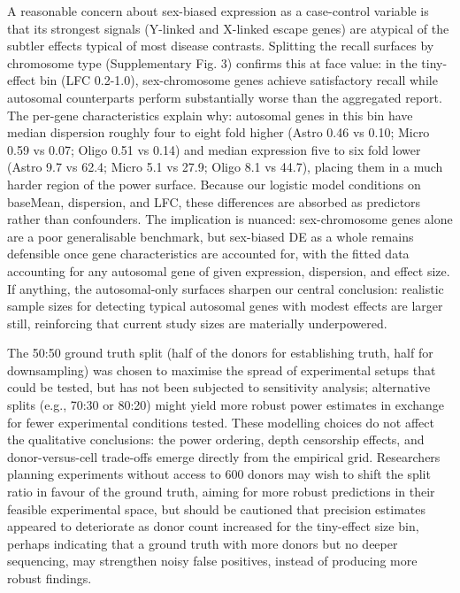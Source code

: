 \documentclass[
]{article}
\begin{document}
A reasonable concern about sex-biased expression as a case-control
variable is that its strongest signals (Y-linked and X-linked escape
genes) are atypical of the subtler effects typical of most disease
contrasts. Splitting the recall surfaces by chromosome type
(Supplementary Fig. 3) confirms this at face value: in the tiny-effect
bin (\textbar LFC\textbar{} 0.2-1.0), sex-chromosome genes achieve
satisfactory recall while autosomal counterparts perform substantially
worse than the aggregated report. The per-gene characteristics explain
why: autosomal genes in this bin have median dispersion roughly four to
eight fold higher (Astro 0.46 vs 0.10; Micro 0.59 vs 0.07; Oligo 0.51 vs
0.14) and median expression five to six fold lower (Astro 9.7 vs 62.4;
Micro 5.1 vs 27.9; Oligo 8.1 vs 44.7), placing them in a much harder
region of the power surface. Because our logistic model conditions on
baseMean, dispersion, and \textbar LFC\textbar, these differences are
absorbed as predictors rather than confounders. The implication is
nuanced: sex-chromosome genes alone are a poor generalisable benchmark,
but sex-biased DE as a whole remains defensible once gene
characteristics are accounted for, with the fitted data accounting for
any autosomal gene of given expression, dispersion, and effect size. If
anything, the autosomal-only surfaces sharpen our central conclusion:
realistic sample sizes for detecting typical autosomal genes with modest
effects are larger still, reinforcing that current study sizes are
materially underpowered.

The 50:50 ground truth split (half of the donors for establishing truth,
half for downsampling) was chosen to maximise the spread of experimental
setups that could be tested, but has not been subjected to sensitivity
analysis; alternative splits (e.g., 70:30 or 80:20) might yield more
robust power estimates in exchange for fewer experimental conditions
tested. These modelling choices do not affect the qualitative
conclusions: the power ordering, depth censorship effects, and
donor-versus-cell trade-offs emerge directly from the empirical grid.
Researchers planning experiments without access to 600 donors may wish
to shift the split ratio in favour of the ground truth, aiming for more
robust predictions in their feasible experimental space, but should be
cautioned that precision estimates appeared to deteriorate as donor
count increased for the tiny-effect size bin, perhaps indicating that a
ground truth with more donors but no deeper sequencing, may strengthen
noisy false positives, instead of producing more robust findings.
\end{document}
